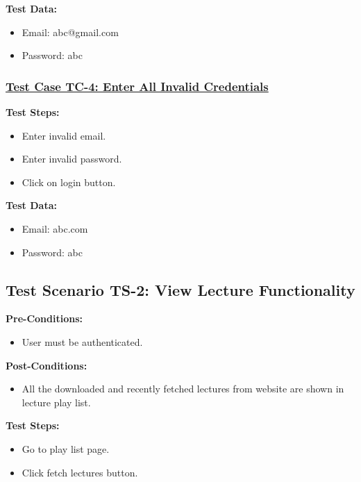 \textbf{Test Data:}
\begin{itemize}

\item Email: abc@gmail.com
\item Password: abc

\end{itemize}

\subsubsection{\underline{Test Case TC-4: Enter All Invalid Credentials}}
\textbf{Test Steps:}
\begin{itemize}

\item Enter invalid email.
\item Enter invalid password.
\item Click on login button.

\end{itemize}

\textbf{Test Data:}
\begin{itemize}

\item Email: abc.com
\item Password: abc

\end{itemize}



\subsection{Test Scenario TS-2: View Lecture Functionality}

\textbf{Pre-Conditions: }
\begin{itemize}

\item User must be authenticated.

\end{itemize}


\textbf{Post-Conditions: }
\begin{itemize}

\item All the downloaded and recently fetched lectures from website are shown in lecture play list.

\end{itemize}


\textbf{Test Steps:}
\begin{itemize}

\item Go to play list page.
\item Click fetch lectures button.

\end{itemize}



